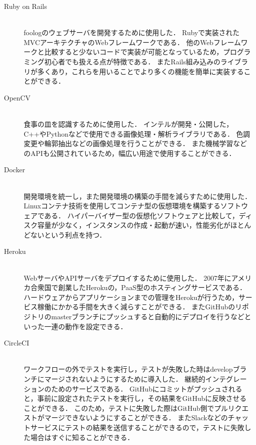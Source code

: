 \documentclass[../report]{subfiles}
\begin{document}
\begin{description}
    \item[Ruby on Rails] \mbox{} \\
        foologのウェブサーバを開発するために使用した．
        Rubyで実装されたMVCアーキテクチャのWebフレームワークである．
        他のWebフレームワークと比較すると少ないコードで実装が可能となっているため，プログラミング初心者でも扱える点が特徴である．
        またRails組み込みのライブラリが多くあり，これらを用いることでより多くの機能を簡単に実装することができる．

    \item[OpenCV] \mbox{} \\
        食事の皿を認識するために使用した．
        インテルが開発・公開した，C++やPythonなどで使用できる画像処理・解析ライブラリである．
        色調変更や輪郭抽出などの画像処理を行うことができる．
        また機械学習などのAPIも公開されているため，幅広い用途で使用することができる．

    \item[Docker] \mbox{} \\
        開発環境を統一し，また開発環境の構築の手間を減らすために使用した．
        Linuxコンテナ技術を使用してコンテナ型の仮想環境を構築するソフトウェアである．
        ハイパーバイザー型の仮想化ソフトウェアと比較して，ディスク容量が少なく，インスタンスの作成・起動が速い，性能劣化がほとんどないという利点を持つ．

    \item[Heroku] \mbox{} \\
        WebサーバやAPIサーバをデプロイするために使用した．
        2007年にアメリカ合衆国で創業したHerokuの，PaaS型のホスティングサービスである．
        ハードウェアからアプリケーションまでの管理をHerokuが行うため，サービス稼働にかかる手間を大きく減らすことができる．
        またGitHubのリポジトリのmasterブランチにプッシュすると自動的にデプロイを行うなどといった一連の動作を設定できる．

    \item[CircleCI] \mbox{} \\
        ワークフローの外でテストを実行し，テストが失敗した時はdevelopブランチにマージされないようにするために導入した．
        継続的インテグレーションのためのサービスである．
        GitHubにコミットがプッシュされると，事前に設定されたテストを実行し，その結果をGitHubに反映させることができる．
        このため，テストに失敗した際はGitHub側でプルリクエストがマージできないようにすることができる．
        またSlackなどのチャットサービスにテストの結果を送信することができるので，テストに失敗した場合はすぐに知ることができる．
\end{description}
\end{document}
